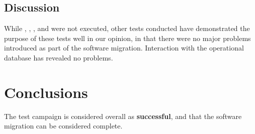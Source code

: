 \subsection{Discussion}

While , , ,  and  were not executed,
other tests conducted have demonstrated the purpose of these tests well in our opinion, in that there were no major
problems introduced as part of the software migration. Interaction with the operational database has revealed no problems.


\section{Conclusions}

The test campaign is considered overall as {\bf successful}, and that the software migration can be considered complete.

